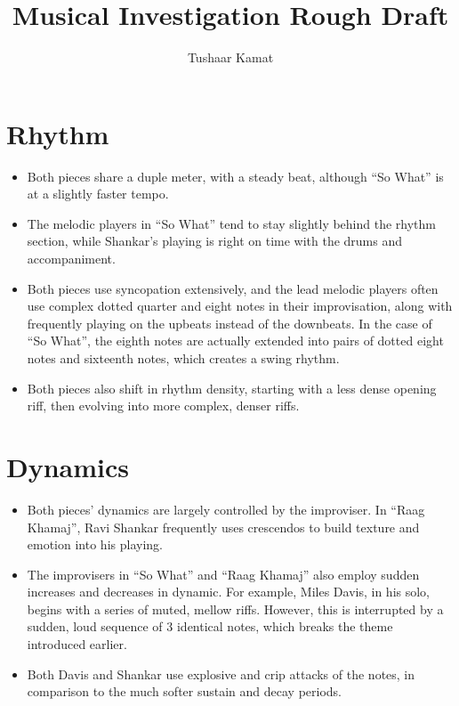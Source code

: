 \documentclass[12pt]{article}
\author{Tushaar Kamat}
\title{Musical Investigation Rough Draft}
\begin{document}
\maketitle

\section*{Rhythm}
\begin{itemize}
\item Both pieces share a duple meter, with a steady beat, although ``So What''
  is at a slightly faster tempo.
\item The melodic players in ``So What'' tend to stay slightly behind the rhythm
  section, while Shankar's playing is right on time with the drums and
  accompaniment. 
\item Both pieces use syncopation extensively, and the lead melodic players
  often use complex dotted quarter and eight notes in their improvisation, along
  with frequently playing on the upbeats instead of the downbeats. In the case
  of ``So What'', the eighth notes are actually extended into pairs of dotted
  eight notes and sixteenth notes, which creates a swing rhythm. 
\item Both pieces also shift in rhythm density, starting with a less dense
  opening riff, then evolving into more complex, denser riffs.
\end{itemize}
\section*{Dynamics}
\begin{itemize}
\item Both pieces' dynamics are largely controlled by the improviser. In ``Raag
  Khamaj'', Ravi Shankar frequently uses crescendos to build texture and emotion
  into his playing. 
\item The improvisers in ``So What'' and ``Raag Khamaj'' also employ sudden
  increases and decreases in dynamic. For example, Miles Davis, in his solo,
  begins with a series of muted, mellow riffs. However, this is interrupted by a
  sudden, loud sequence of 3 identical notes, which breaks the theme introduced
  earlier.
\item Both Davis and Shankar use explosive and crip attacks of the notes, in
  comparison to the much softer sustain and decay periods.  
\end{itemize}
\end{document}

